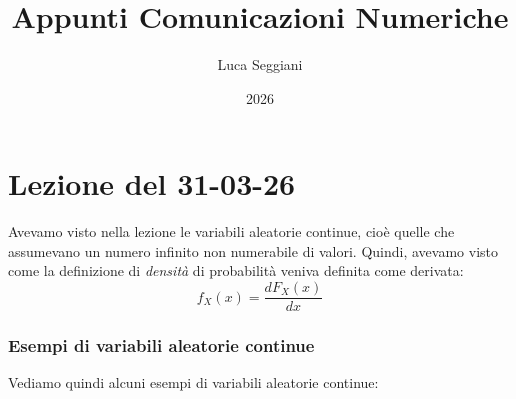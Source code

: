 \documentclass[a4paper,11pt]{article}
\title{Appunti Comunicazioni Numeriche}
\author{Luca Seggiani}
\date{2026}
\begin{document}
\section{Lezione del 31-03-26}

\thispagestyle{empty}
\pagestyle{fancy}

Avevamo visto nella lezione le variabili aleatorie continue, cioè quelle che assumevano un numero infinito non numerabile di valori. Quindi, avevamo visto come la definizione di \textit{densità} di probabilità veniva definita come derivata:
$$
f_X(x) = \frac{dF_X (x)}{dx}
$$

\subsubsection{Esempi di variabili aleatorie continue}
Vediamo quindi alcuni esempi di variabili aleatorie continue:
\end{document}
